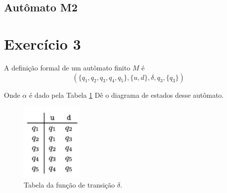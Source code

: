 \documentclass[a4paper, 12pt]{article}
\begin{document}
\subsection{Autômato M2}

\newpage
\section{Exercício 3}

A definição formal de um autômato finito $M$ é 
$$(\{q_1, q_2, q_3, q_4, q_5\}, \{u, d\}, \delta, q_3, \{q_3\})$$

Onde $\alpha$ é dado pela Tabela \ref{fig:table_delta} Dê o diagrama de estados desse autômato.

\begin{figure}[!ht]
    \centering
    \includegraphics[width=3cm]{./imgs/table_delta.png}
    \caption{Tabela da função de transição $\delta$.}
    \label{fig:table_delta}
\end{figure}


\end{document}
